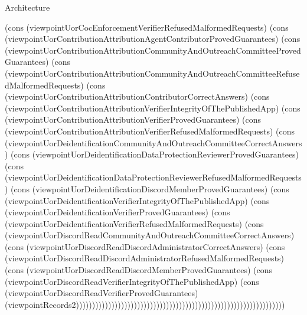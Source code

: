 \begin{lexlean}{Architecture}
\begin{semanticmodule}
{(cons (viewpointUorCocEnforcementVerifierRefusedMalformedRequests) (cons (viewpointUorContributionAttributionAgentContributorProvedGuarantees) (cons (viewpointUorContributionAttributionCommunityAndOutreachCommitteeProvedGuarantees) (cons (viewpointUorContributionAttributionCommunityAndOutreachCommitteeRefusedMalformedRequests) (cons (viewpointUorContributionAttributionContributorCorrectAnswers) (cons (viewpointUorContributionAttributionVerifierIntegrityOfThePublishedApp) (cons (viewpointUorContributionAttributionVerifierProvedGuarantees) (cons (viewpointUorContributionAttributionVerifierRefusedMalformedRequests) (cons (viewpointUorDeidentificationCommunityAndOutreachCommitteeCorrectAnswers) (cons (viewpointUorDeidentificationDataProtectionReviewerProvedGuarantees) (cons (viewpointUorDeidentificationDataProtectionReviewerRefusedMalformedRequests) (cons (viewpointUorDeidentificationDiscordMemberProvedGuarantees) (cons (viewpointUorDeidentificationVerifierIntegrityOfThePublishedApp) (cons (viewpointUorDeidentificationVerifierProvedGuarantees) (cons (viewpointUorDeidentificationVerifierRefusedMalformedRequests) (cons (viewpointUorDiscordReadCommunityAndOutreachCommitteeCorrectAnswers) (cons (viewpointUorDiscordReadDiscordAdministratorCorrectAnswers) (cons (viewpointUorDiscordReadDiscordAdministratorRefusedMalformedRequests) (cons (viewpointUorDiscordReadDiscordMemberProvedGuarantees) (cons (viewpointUorDiscordReadVerifierIntegrityOfThePublishedApp) (cons (viewpointUorDiscordReadVerifierProvedGuarantees) (viewpointRecords2)))))))))))))))))))))))))))))))))))))))))))))))))))))))))))))))))
}


\end{semanticmodule}
\end{lexlean}
